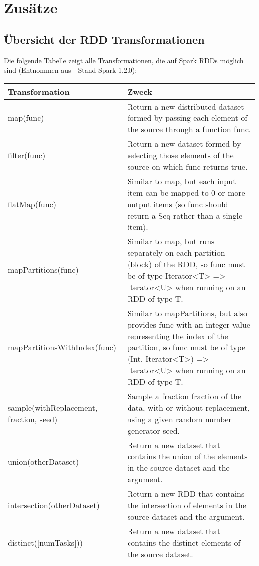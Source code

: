 
\chapter{Zusätze}
\label{chapter:anhang}

\printglossary[type=\acronymtype,title=Abkürzungen]


\section{Übersicht der RDD Transformationen}
\label{section:rddtransform}

Die folgende Tabelle zeigt alle Transformationen, die auf Spark RDDs möglich sind (Entnommen aus  - Stand Spark 1.2.0):

\begin{tabular}{| p{5cm} | p{8cm} | }
\hline
Transformation & Zweck \\ \hline \hline
map(func) & Return a new distributed dataset formed by passing each element of the source through a function func.  \\ \hline 
filter(func) & Return a new dataset formed by selecting those elements of the source on which func returns true. \\ \hline 
flatMap(func) & Similar to map, but each input item can be mapped to 0 or more output items (so func should return a Seq rather than a single item).\\ \hline 
mapPartitions(func) & Similar to map, but runs separately on each partition (block) of the RDD, so func must be of type Iterator<T> => Iterator<U> when running on an RDD of type T. \\ \hline 
mapPartitionsWithIndex(func) & Similar to mapPartitions, but also provides func with an integer value representing the index of the partition, so func must be of type (Int, Iterator<T>) => Iterator<U> when running on an RDD of type T. \\ \hline 
sample(withReplacement, fraction, seed) & Sample a fraction fraction of the data, with or without replacement, using a given random number generator seed. \\ \hline 
union(otherDataset) & Return a new dataset that contains the union of the elements in the source dataset and the argument. \\ \hline 
intersection(otherDataset) & Return a new RDD that contains the intersection of elements in the source dataset and the argument. \\ \hline 
distinct([numTasks])) & Return a new dataset that contains the distinct elements of the source dataset. \\ \hline 

\end{tabular}

